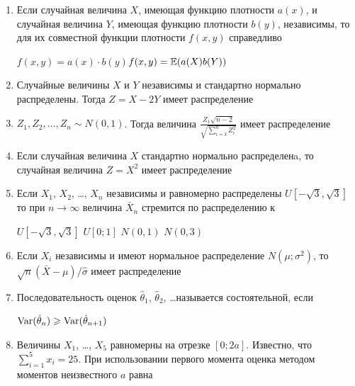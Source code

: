 \documentclass[12pt, a4paper]{article}\usepackage[]{graphicx}\usepackage[]{color}
\begin{document}
\begin{enumerate}
\item Если случайная величина $X$, имеющая функцию плотности $a(x)$, и случайная величина $Y$, имеющая функцию плотности $b(y)$, независимы, то для их совместной функции плотности  $f(x,y)$ справедливо

{$f(x,y)=a(x)\cdot b(y)$}{$f(x,y)=\mathbb{E}(a(X)b(Y))$}


\item Случайные величины $X$ и $Y$ независимы и стандартно нормально распределены. Тогда $Z=X-2Y$ имеет распределение


\item $Z_1,Z_2,\ldots,Z_n\sim N(0,1)$. Тогда величина $\frac{Z_1\sqrt{n-2}}{\sqrt{\sum_{i=3}^n Z_i^2}}$ имеет распределение


\item Если случайная величина $X$ стандартно нормально распределенa, то случайная величина $Z=X^2$ имеет распределение


\item Если $X_1$, $X_2$, \ldots, $X_n$ независимы и равномерно распределены $U[-\sqrt{3},\sqrt{3}]$  то при $n\to\infty$ величина $\bar{X}_n$ стремится по распределению к


{$U[-\sqrt{3},\sqrt{3}]$}
{$U[0;1]$}
{$N(0,1)$}
{$N(0,3)$}

\item Если $X_i$ независимы и имеют нормальное распределение $N(\mu;\sigma^2)$, то $\sqrt{n}(\bar{X}-\mu)/\hat{\sigma}$ имеет распределение


\item Последовательность оценок $\hat{\theta}_1$, $\hat{\theta}_2$, \ldots называется состоятельной, если

{$\operatorname{Var}(\hat{\theta}_n)\geqslant \operatorname{Var}(\hat{\theta}_{n+1})$}

\item Величины $X_1$, \ldots, $X_5$ равномерны на отрезке $[0;2a]$. Известно, что $\sum_{i=1}^5 x_i=25$. При использовании первого момента оценка методом моментов неизвестного $a$ равна


\end{enumerate}
\end{document}
